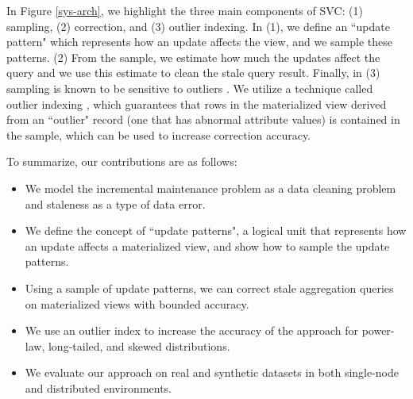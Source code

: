 

In Figure \ref{sys-arch}, we highlight the three main components of SVC: (1) sampling, (2) correction, and (3) outlier indexing. In (1), we define an ``update pattern" which represents how an update affects the view, and we sample these patterns. (2)  From the sample, we estimate how much the updates affect the query and we use this estimate to clean the stale query result.
Finally, in (3) sampling is known to be sensitive to outliers \cite{chaudhuri2001overcoming}.
We utilize a technique called outlier indexing \cite{chaudhuri2001overcoming}, which guarantees that rows in the materialized view derived from an ``outlier" record (one that has abnormal attribute values) is contained in the sample, which can be used to increase correction accuracy.

To summarize, our contributions are as follows:

\begin{itemize}\vspace{-.45em}
\item We model the incremental maintenance problem as a data cleaning problem and staleness as a type of data error.\vspace{-.45em}
\item We define the concept of ``update patterns", a logical unit that represents how an update affects a materialized view, and show how to sample the update patterns. \vspace{-.45em}
\item Using a sample of update patterns, we can correct stale aggregation queries on materialized views with bounded accuracy.\vspace{-.45em}
\item We use an outlier index to increase the accuracy of the approach for power-law, long-tailed, and skewed distributions.\vspace{-.45em}
\item We evaluate our approach on real and synthetic datasets in both single-node and distributed environments.\vspace{-.45em}
\end{itemize}

